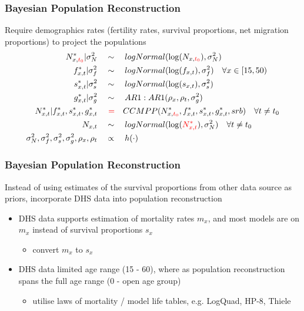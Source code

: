 \documentclass[hyperref={colorlinks, citecolor=blue}]{beamer}
\begin{document}
\begin{frame}
\frametitle{Bayesian Population Reconstruction}
Require demographics rates (fertility rates, survival proportions, net migration proportions) to project the populations
\begin{align*}
N^*_{x,\color{red}t_0}|\sigma^2_N \quad &\sim \quad logNormal(\log(N_{x,\color{red}t_0}), \sigma^2_N) \\
f^*_{x,t}|\sigma^2_f \quad & \sim \quad logNormal(\log(f_{x,t}), \sigma^2_f) \quad \forall x \in [15, 50) \\
s^*_{x,t}|\sigma^2_s \quad & \sim \quad logNormal(\log(s_{x,t}), \sigma^2_s) \\
g^*_{x,t}|\sigma^2_g \quad &\sim \quad AR1:AR1(\rho_x, \rho_t, \sigma^2_g) \\
N^*_{x,t} | f^*_{x,t}, s^*_{x,t}, g^*_{x,t} \quad & \, \, \textcolor{red}{=} \quad CCMPP(N^*_{x,\color{red}t_0}, f^*_{x,t}, s^*_{x,t}, g^*_{x,t}, srb) \quad \forall t \neq t_0 \\
N_{x,t} \quad &\sim \quad logNormal(\log(\textcolor{red}{N^*_{x,t}}), \sigma^2_N) \quad \forall t \neq t_0 \\
\sigma^2_N, \sigma^2_f, \sigma^2_s, \sigma^2_g, \rho_x, \rho_t \quad &\propto  \quad h(\cdot)
\end{align*}
\end{frame}

\begin{frame}
\frametitle{Bayesian Population Reconstruction}
Instead of using estimates of the survival proportions from other data source as priors, incorporate DHS data into population reconstruction
\begin{itemize}
\item DHS data supports estimation of mortality rates $m_x$, and most models are on $m_x$ instead of survival proportions $s_x$
 \begin{itemize}
 \item[\hookrightarrow] convert $m_x$ to $s_x$
 \end{itemize}
\item DHS data limited age range (15 - 60), where as population reconstruction spans the full age range (0 - open age group)
 \begin{itemize}
 \item[\hookrightarrow] utilise laws of mortality / model life tables, e.g. LogQuad, HP-8, Thiele
 \end{itemize}
\end{itemize}
\end{frame}
\end{document}
